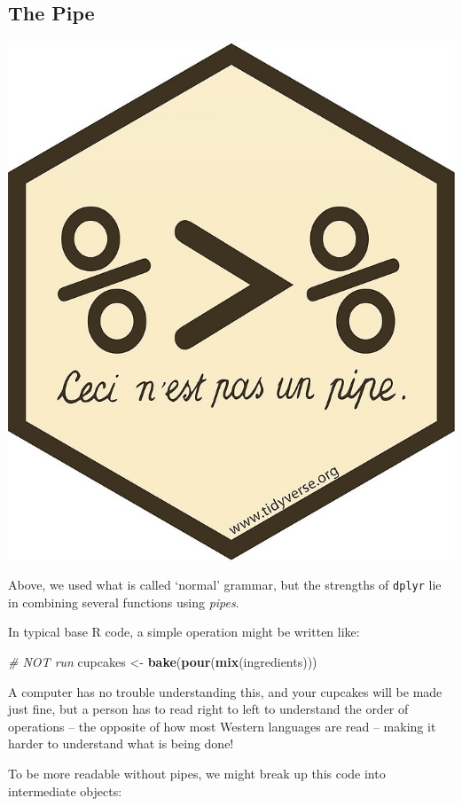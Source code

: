 \documentclass[
]{book}
\newenvironment{Shaded}{\begin{snugshade}}{\end{snugshade}}
\newcommand{\CommentTok}[1]{\textcolor[rgb]{0.56,0.35,0.01}{\textit{#1}}}
\newcommand{\KeywordTok}[1]{\textcolor[rgb]{0.13,0.29,0.53}{\textbf{#1}}}
\newcommand{\NormalTok}[1]{#1}
\newcommand{\StringTok}[1]{\textcolor[rgb]{0.31,0.60,0.02}{#1}}
\begin{document}
\hypertarget{the-pipe}{%
\subsection{The Pipe}\label{the-pipe}}

\begin{center}\includegraphics[width=0.7\linewidth]{img/pipe} \end{center}

Above, we used what is called `normal' grammar, but the strengths of \texttt{dplyr} lie in combining several functions using \emph{pipes}.

In typical base R code, a simple operation might be written like:

\begin{Shaded}
\begin{Highlighting}[]
\CommentTok{# NOT run}
\NormalTok{cupcakes <-}\StringTok{ }\KeywordTok{bake}\NormalTok{(}\KeywordTok{pour}\NormalTok{(}\KeywordTok{mix}\NormalTok{(ingredients)))}
\end{Highlighting}
\end{Shaded}

A computer has no trouble understanding this, and your cupcakes will be made just fine, but a person has to read right to left to understand the order of operations -- the opposite of how most Western languages are read -- making it harder to understand what is being done!

To be more readable without pipes, we might break up this code into intermediate objects:
\end{document}
